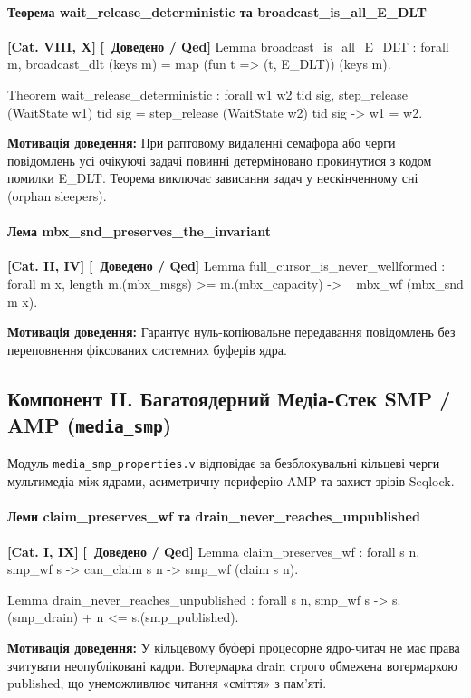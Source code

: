 \documentclass{article}
\let\originalfootnotesize\footnotesize
\let\oldverbatim\verbatim
\let\oldendverbatim\endverbatim
\renewenvironment{verbatim}{\originalfootnotesize\oldverbatim}{\oldendverbatim}
\newcommand{\thmcategory}[1]{{\small\textbf{\color{coreblue}[#1]}}}
\newcommand{\thmproven}{{\small\textbf{\color{productgreen}[\checkmark\ Доведено / Qed]}}}
\newcommand{\thmmotivation}[1]{%
  \par\smallskip\noindent\colorbox{boxbg}{\parbox{\dimexpr\linewidth-2\fboxsep\relax}{%
    \small\textbf{Мотивація доведення:} #1%
  }}\par\medskip
}
\begin{document}
\paragraph{Теорема wait\_release\_deterministic та broadcast\_is\_all\_E\_DLT} \thmcategory{Cat. VIII, X} \thmproven
\begin{verbatim}
Lemma broadcast_is_all_E_DLT : forall m,
  broadcast_dlt (keys m) = map (fun t => (t, E_DLT)) (keys m).

Theorem wait_release_deterministic : forall w1 w2 tid sig,
  step_release (WaitState w1) tid sig = step_release (WaitState w2) tid sig ->
  w1 = w2.
\end{verbatim}
\thmmotivation{При раптовому видаленні семафора або черги повідомлень усі очікуючі задачі повинні детерміновано прокинутися з кодом помилки E\_DLT. Теорема виключає зависання задач у нескінченному сні (orphan sleepers).}

\paragraph{Лема mbx\_snd\_preserves\_the\_invariant} \thmcategory{Cat. II, IV} \thmproven
\begin{verbatim}
Lemma full_cursor_is_never_wellformed : forall m x,
  length m.(mbx_msgs) >= m.(mbx_capacity) ->
  ~ mbx_wf (mbx_snd m x).
\end{verbatim}
\thmmotivation{Гарантує нуль-копіювальне передавання повідомлень без переповнення фіксованих системних буферів ядра.}

\subsection[Компонент II. Багатоядерний Стек SMP / AMP]{Компонент II. Багатоядерний Медіа-Стек SMP / AMP (\texttt{media\_smp})}

Модуль \texttt{media\_smp\_properties.v} відповідає за безблокувальні кільцеві черги мультимедіа між ядрами, асиметричну периферію AMP та захист зрізів Seqlock.

\paragraph{Леми claim\_preserves\_wf та drain\_never\_reaches\_unpublished} \thmcategory{Cat. I, IX} \thmproven
\begin{verbatim}
Lemma claim_preserves_wf : forall s n,
  smp_wf s -> can_claim s n -> smp_wf (claim s n).

Lemma drain_never_reaches_unpublished : forall s n,
  smp_wf s ->
  s.(smp_drain) + n <= s.(smp_published).
\end{verbatim}
\thmmotivation{У кільцевому буфері процесорне ядро-читач не має права зчитувати неопубліковані кадри. Вотермарка drain строго обмежена вотермаркою published, що унеможливлює читання «сміття» з пам'яті.}
\end{document}
